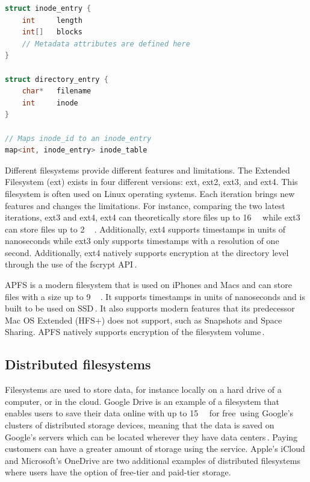 \begin{minipage}{\linewidth}
\begin{lstlisting}[language=c, caption={Pseudocode of a minimalistic inode filesystem structure}, label=lst:inode_fs]
struct inode_entry {
	int 	length
	int[]	blocks
	// Metadata attributes are defined here
}

struct directory_entry {
	char*   filename
	int     inode
}

// Maps inode_id to an inode_entry
map<int, inode_entry> inode_table

\end{lstlisting}
\end{minipage}

Different filesystems provide different features and limitations. The Extended Filesystem (ext) exists in four different versions: ext, ext2, ext3, and ext4. This filesystem is often used on Linux operating systems. Each iteration brings new features and changes the limitations. For instance, comparing the two latest iterations, ext3 and ext4, ext4 can theoretically store files up to \SI{16}{\tebi\byte} while ext3 can store files up to \SI{2}{\tebi\byte}\,\cite{salterUnderstandingLinuxFilesystems2018}. Additionally, ext4 supports timestamps in units of nanoseconds while ext3 only supports timestamps with a resolution of one second. Additionally, ext4 natively supports encryption at the directory level through the use of the fscrypt \gls{API}\,\cite{FscryptArchWiki}.

\gls{APFS} is a modern filesystem that is used on iPhones and Macs and can store files with a size up to \SI{9}{\exa\byte}\,\cite{igotofferAPFSAppleFile2017}. It supports timestamps in units of nanoseconds and is built to be used on \gls{SSD}\,\cite{nelsonWhatAPFSDoes}. It also supports modern features that its predecessor Mac OS Extended (HFS+) does not support, such as Snapshots and Space Sharing. \gls{APFS} natively supports encryption of the filesystem volume\,\cite{appleinc.FileSystemFormats}.

\subsection{Distributed filesystems}
Filesystems are used to store data, for instance locally on a hard drive of a computer, or in the cloud. Google Drive is an example of a filesystem that enables users to save their data online with up to \SI{15}{\giga\byte} for free\,\cite{CloudStorageWork} using Google's clusters of distributed storage devices, meaning that the data is saved on Google's servers which can be located wherever they have data centers\,\cite{DistributedStorageWhat}. Paying customers can have a greater amount of storage using the service. Apple's iCloud and Microsoft's OneDrive are two additional examples of distributed filesystems where users have the option of \mbox{free-tier} and \mbox{paid-tier} storage.

